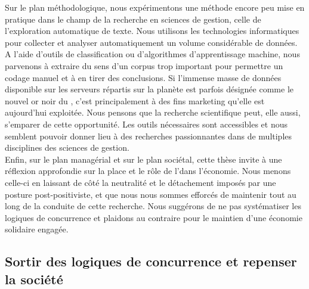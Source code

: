 Sur le plan méthodologique, nous expérimentons une méthode encore peu mise en pratique dans le champ de la recherche en sciences de gestion, celle de l'exploration automatique de texte. Nous utilisons les technologies informatiques pour collecter et analyser automatiquement un volume considérable de données. A l'aide d'outils de classification ou d'algorithmes d'apprentissage machine, nous parvenons à extraire du sens d'un corpus trop important pour permettre un codage manuel et à en tirer des conclusions. Si l'immense masse de données disponible sur les serveurs répartis sur la planète est parfois désignée comme le nouvel or noir du , c'est principalement à des fins marketing qu'elle est aujourd'hui exploitée. Nous pensons que la recherche scientifique peut, elle aussi, s'emparer de cette opportunité. Les outils nécessaires sont accessibles et nous semblent pouvoir donner lieu à des recherches passionnantes dans de multiples disciplines des sciences de gestion. \\

Enfin, sur le plan managérial et sur le plan sociétal, cette thèse invite à une réflexion approfondie sur la place et le rôle de l'\ess dans l'économie. Nous menons celle-ci en laissant de côté la neutralité et le détachement imposés par une posture post-positiviste, et que nous nous sommes efforcés de maintenir tout au long de la conduite de cette recherche. Nous suggérons de ne pas systématiser les logiques de concurrence et plaidons au contraire pour le maintien d'une économie solidaire engagée.


\subsection*{Sortir des logiques de concurrence et repenser la société}

